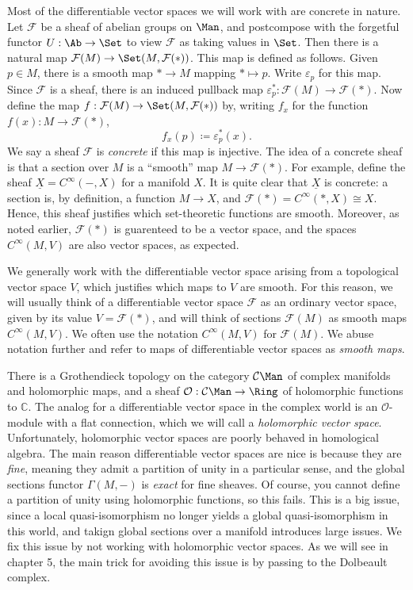 Most of the differentiable vector spaces we will work with are concrete in nature. Let $\mathcal{F} $ be a sheaf of abelian groups on $\Man $, and postcompose with the forgetful functor $U : \Ab  \to \Set $ to view $\mathcal{F} $ as taking values in $\Set $. Then there is a natural map $\mathcal{F} (M)\to \Set (M,\mathcal{F} (*))$. This map is defined as follows. Given $p\in M$, there is a smooth map $*\to M$ mapping $*\mapsto p$. Write $\varepsilon _p$ for this map. Since $\mathcal{F} $ is a sheaf, there is an induced pullback map $\varepsilon _p^* : \mathcal{F} (M) \to \mathcal{F} (*)$. Now define the map $f : \mathcal{F} (M) \to \Set (M,\mathcal{F} (*))$ by, writing $f_x$ for the function $f(x) : M \to \mathcal{F} (*)$,
\[
	f_x(p) \coloneqq \varepsilon_p^*(x)
.\]
We say a sheaf $\mathcal{F} $ is \emph{concrete} if this map is injective. The idea of a concrete sheaf is that a section over $M$ is a ``smooth'' map $M\to \mathcal{F} (*)$. For example, define the sheaf $\underline{X} =C^\infty(-,X) $ for a manifold $X$. It is quite clear that $\underline{X} $ is concrete: a section is, by definition, a function $M\to X$, and $\mathcal{F} (*) = C^\infty(*,X) \cong X$. Hence, this sheaf justifies which set-theoretic functions are smooth. Moreover, as noted earlier, $\mathcal{F} (*)$ is guarenteed to be a vector space, and the spaces $C^\infty (M,V)$ are also vector spaces, as expected.

We generally work with the differentiable vector space arising from a topological vector space $V$, which justifies which maps to $V$ are smooth. For this reason, we will usually think of a differentiable vector space $\mathcal{F} $ as an ordinary vector space, given by its value $V=\mathcal{F} (*)$, and will think of sections $\mathcal{F} (M)$ as smooth maps $C^\infty (M,V)$. We often use the notation $C^\infty(M,V) $ for $\mathcal{F} (M)$. We abuse notation further and refer to maps of differentiable vector spaces as \emph{smooth maps}.

\begin{variant}\label{var:3-5-8}
	There is a Grothendieck topology on the category $\mathcal{C} \Man $ of complex manifolds and holomorphic maps, and a sheaf $\mathcal{O} : \mathcal{C} \Man  \to \Ring $ of holomorphic functions to $\mathbb{C} $. The analog for a differentiable vector space in the complex world is an $\mathcal{O} $-module with a flat connection, which we will call a \emph{holomorphic vector space}. Unfortunately, holomorphic vector spaces are poorly behaved in homological algebra. The main reason differentiable vector spaces are nice is because they are \emph{fine}, meaning they admit a partition of unity in a particular sense, and the global sections functor $\Gamma (M,-)$ is \emph{exact} for fine sheaves. Of course, you cannot define a partition of unity using holomorphic functions, so this fails. This is a big issue, since a local quasi-isomorphism no longer yields a global quasi-isomorphism in this world, and takign global sections over a manifold introduces large issues. We fix this issue by not working with holomorphic vector spaces. As we will see in chapter 5, the main trick for avoiding this issue is by passing to the Dolbeault complex.
\end{variant}


